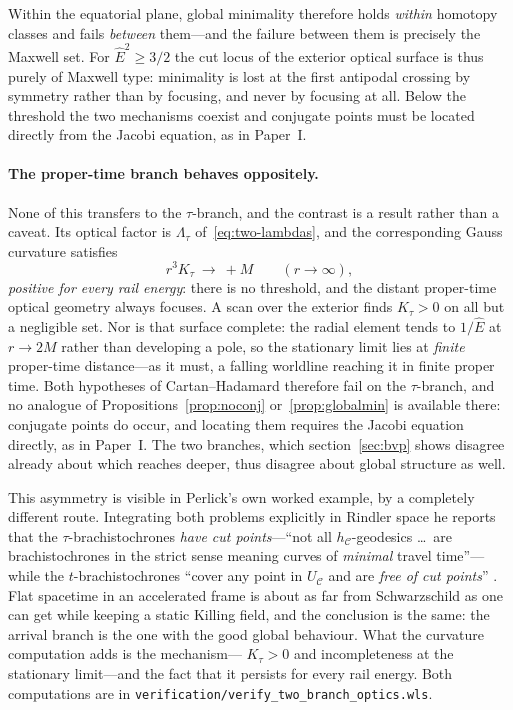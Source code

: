 \documentclass[12pt]{iopart}
\theoremstyle{plain}
\theoremstyle{definition}
\theoremstyle{remark}
\newcommand{\Ehat}{\hat E}
\begin{document}
Within the equatorial plane, global minimality therefore holds \emph{within}
homotopy classes and fails \emph{between} them---and the failure between them is
precisely the Maxwell set.
For $\Ehat^2\ge3/2$ the cut locus of the exterior optical surface is thus purely
of Maxwell type: minimality is lost at the first antipodal crossing by symmetry
rather than by focusing, and never by focusing at all. Below the
threshold the two mechanisms coexist and conjugate points must be located
directly from the Jacobi equation, as in Paper~I.

\paragraph{The proper-time branch behaves oppositely.} None of this transfers to
the $\tau$-branch, and the contrast is a result rather than a caveat. Its optical
factor is $\Lambda_\tau$ of~\eqref{eq:two-lambdas}, and the corresponding Gauss
curvature satisfies
\begin{equation}
    r^3K_\tau\ \longrightarrow\ +M \qquad (r\to\infty),
    \label{eq:ktau-asym}
\end{equation}
\emph{positive for every rail energy}: there is no threshold, and the distant
proper-time optical geometry always focuses. A scan over the exterior finds
$K_\tau>0$ on all but a negligible set. Nor is that surface complete: the radial
element tends to $1/\Ehat$ at $r\to2M$ rather than developing a pole, so the
stationary limit lies at \emph{finite} proper-time distance---as it must, a
falling worldline reaching it in finite proper time. Both hypotheses of
Cartan--Hadamard therefore fail on the $\tau$-branch, and no analogue of
Propositions~\ref{prop:noconj} or~\ref{prop:globalmin} is available there:
conjugate points do occur, and locating them requires the Jacobi equation
directly, as in Paper~I. The two branches, which section~\ref{sec:bvp} shows
disagree already about which reaches deeper, thus disagree about global structure
as well.

This asymmetry is visible in Perlick's own worked example, by a completely
different route. Integrating both problems
explicitly in Rindler space he reports that the $\tau$-brachistochrones
\emph{have cut points}---``not all $h_{\mathcal C}$-geodesics \dots\ are
brachistochrones in the strict sense meaning curves of \emph{minimal} travel
time''---while the $t$-brachistochrones ``cover any point in
$U_{\mathcal C}$ and are \emph{free of cut points}''
\cite[\S3, Figs.~5--6]{Perlick1991}. Flat spacetime in an accelerated frame is
about as far from Schwarzschild as one can get while keeping a static Killing
field, and the conclusion is the same: the arrival branch is the one with the
good global behaviour. What the curvature computation adds is the mechanism---%
$K_\tau>0$ and incompleteness at the stationary limit---and the fact that it
persists for every rail energy. Both computations are in
\texttt{verification/verify\_two\_branch\_optics.wls}.
\end{document}
